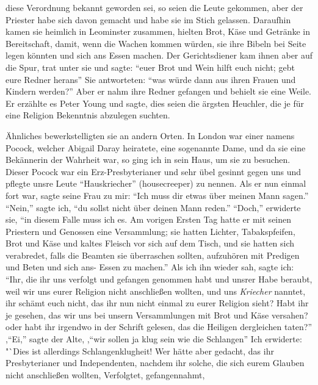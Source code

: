 diese Verordnung bekannt geworden sei, so seien die Leute gekommen, 
aber der Priester habe sich davon gemacht und habe sie
im Stich gelassen. Daraufhin kamen sie heimlich in Leominster
zusammen, hielten Brot, Käse und Getränke in Bereitschaft, damit,
wenn die Wachen kommen würden, sie ihre Bibeln bei Seite legen
könnten und sich ans Essen machen. Der Gerichtsdiener kam
ihnen aber auf die Spur, trat unter sie und sagte: "`euer Brot
und Wein hilft euch nicht; gebt eure Redner herans"' Sie 
antworteten: "`was würde dann aus ihren Frauen und Kindern
werden?"' Aber er nahm ihre Redner gefangen und behielt sie
eine Weile. Er erzählte es Peter Young und sagte, dies seien
die ärgsten Heuchler, die je für eine Religion Bekenntnis 
abzulegen suchten.

Ähnliches bewerkstelligten sie an andern Orten. In London
war einer namens Pocock, welcher 
Abigail Daray heiratete, eine
sogenannte Dame, und da sie eine Bekännerin der Wahrheit war,
so ging ich in sein Haus, um sie zu besuchen. Dieser Pocock
war ein Erz-Presbyterianer und sehr übel gesinnt gegen uns
und pflegte unsre Leute "`Hauskriecher"' (housecreeper) zu nennen.
Als er nun einmal fort war, sagte seine Frau zu mir: "`Ich muss
dir etwas über meinen Mann sagen."' "`Nein,"' sagte ich, "`du
sollst nicht über deinen Mann reden."' "`Doch,"' erwiderte sie,
"`in diesem Falle muss ich es. Am vorigen Ersten Tag hatte
er mit seinen Priestern und Genossen eine Versammlung; sie hatten
Lichter, Tabakspfeifen, Brot und Käse und kaltes Fleisch vor sich
auf dem Tisch, und sie hatten sich verabredet, falls die Beamten
sie überraschen sollten, aufzuhören mit Predigen und Beten und
sich ans- Essen zu machen."' Als ich ihn wieder sah, sagte ich:
"`Ihr, die ihr uns verfolgt und gefangen genommen habt und
unsrer Habe beraubt, weil wir uns eurer Religion nicht anschließen 
wollten, und uns \textit{Kriecher} nanntet, ihr schämt euch nicht,
das ihr nun nicht einmal zu eurer Religion sieht? Habt ihr je
gesehen, das wir uns bei unsern Versammlungen mit Brot und
Käse versahen? oder habt ihr irgendwo in der Schrift gelesen,
das die Heiligen dergleichen taten?"' ,"`Ei,"' sagte der Alte, ,"`wir
sollen ja klug sein wie die Schlangen"' Ich erwiderte: "`Dies
ist allerdings Schlangenklugheit! Wer hätte aber gedacht, das
ihr Presbyterianer und Independenten, nachdem ihr solche, die
sich eurem Glauben nicht anschließen wollten, Verfolgtet, gefangennahmt,
